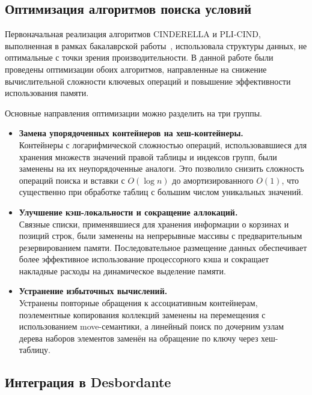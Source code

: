 \subsection{Оптимизация алгоритмов поиска условий}

Первоначальная реализация алгоритмов CINDERELLA и PLI-CIND, выполненная в рамках бакалаврской работы~\cite{abrosimov2025cinderella}, использовала структуры данных, не оптимальные с точки зрения производительности. В данной работе были проведены оптимизации обоих алгоритмов, направленные на снижение вычислительной сложности ключевых операций и повышение эффективности использования памяти.

Основные направления оптимизации можно разделить на три группы.
\begin{itemize}
    \item \textbf{Замена упорядоченных контейнеров на хеш-контейнеры.}\\ 
    Контейнеры с логарифмической сложностью операций, использовавшиеся для хранения множеств значений правой таблицы и индексов групп, были заменены на их неупорядоченные аналоги. Это позволило снизить сложность операций поиска и вставки с $O(\log n)$ до амортизированного $O(1)$, что существенно при обработке таблиц с большим числом уникальных значений.

    \item \textbf{Улучшение кэш-локальности и сокращение аллокаций.}\\
    Связные списки, применявшиеся для хранения информации о корзинах и позиций строк, были заменены на непрерывные массивы с предварительным резервированием памяти. Последовательное размещение данных обеспечивает более эффективное использование процессорного кэша и сокращает накладные расходы на динамическое выделение памяти.

    \item \textbf{Устранение избыточных вычислений.}\\
    Устранены повторные обращения к ассоциативным контейнерам, поэлементные копирования коллекций заменены на перемещения с использованием move-семантики, а линейный поиск по дочерним узлам дерева наборов элементов заменён на обращение по ключу через хеш-таблицу.
\end{itemize}

\subsection{Интеграция в Desbordante}

